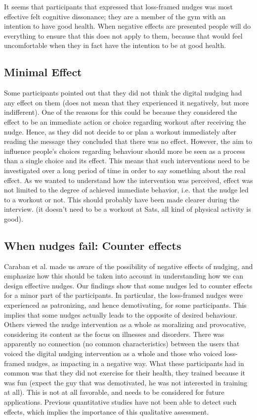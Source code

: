 It seems that participants that expressed that loss-framed nudges was most effective felt cognitive dissonance; they are a member of the gym with an intention to have good health. When negative effects are presented people will do everything to ensure that this does not apply to them, because that would feel uncomfortable when they in fact have the intention to be at good health. 

\subsection{Minimal Effect}
Some participants pointed out that they did not think the digital nudging had any effect on them (does not mean that they experienced it negatively, but more indifferent). One of the reasons for this could be because they considered the effect to be an immediate action or choice regarding workout after receiving the nudge. Hence, as they did not decide to or plan a workout immediately after reading the message they concluded that there was no effect. However, the aim to influence people's choices regarding behaviour should more be seen as a process than a single choice and its effect. This means that such interventions need to be investigated over a long period of time in order to say something about the real effect. As we wanted to understand how the intervention was perceived, effect was not limited to the degree of achieved immediate behavior, i.e. that the nudge led to a workout or not. This should probably have been made clearer during the interview. (it doesn't need to be a workout at Sats, all kind of physical activity is good).

\subsection{When nudges fail: Counter effects}
Caraban et al. \cite{caraban_23_2019} made us aware of the possibility of negative effects of nudging, and emphasize how this should be taken into account in understanding how we can design effective nudges. Our findings show that some nudges led to counter effects for a minor part of the participants. In particular, the loss-framed nudges were experienced as patronizing, and hence demotivating, for some participants. This implies that some nudges actually leads to the opposite of desired behaviour. Others viewed the nudge intervention as a whole as moralizing and provocative, considering its content as the focus on illnesses and disorders. There was apparently no connection (no common characteristics) between the users that voiced the digital nudging intervention as a whole and those who voiced loss-framed nudges, as impacting in a negative way. What these participants had in common was that they did not exercise for their health, they trained because it was fun (expect the guy that was demotivated, he was not interested in training at all). This is not at all favorable, and needs to be considered for future applications. Previous quantitative studies have not been able to detect such effects, which implies the importance of this qualitative assessment.  


